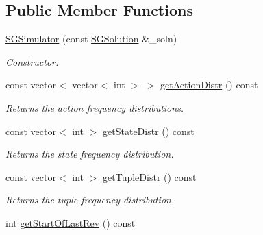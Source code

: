 \subsection*{Public Member Functions}
\begin{DoxyCompactItemize}
\item 
\mbox{\label{classSGSimulator_ad8e72623b6f2d9ecb46b5e5fe5f68d10}} 
\hyperlink{classSGSimulator_ad8e72623b6f2d9ecb46b5e5fe5f68d10}{S\+G\+Simulator} (const \hyperlink{classSGSolution}{S\+G\+Solution} \&\+\_\+soln)
\begin{DoxyCompactList}\small\item\em Constructor. \end{DoxyCompactList}\item 
\mbox{\label{classSGSimulator_acff36ca01d87aec1817cd8ceecfbb1d1}} 
const vector$<$ vector$<$ int $>$ $>$ \hyperlink{classSGSimulator_acff36ca01d87aec1817cd8ceecfbb1d1}{get\+Action\+Distr} () const
\begin{DoxyCompactList}\small\item\em Returns the action frequency distributions. \end{DoxyCompactList}\item 
\mbox{\label{classSGSimulator_a0c60d6e663f83fff6f3818cc90412356}} 
const vector$<$ int $>$ \hyperlink{classSGSimulator_a0c60d6e663f83fff6f3818cc90412356}{get\+State\+Distr} () const
\begin{DoxyCompactList}\small\item\em Returns the state frequency distribution. \end{DoxyCompactList}\item 
\mbox{\label{classSGSimulator_aeafea7815915ec935ebb5dce827a7c85}} 
const vector$<$ int $>$ \hyperlink{classSGSimulator_aeafea7815915ec935ebb5dce827a7c85}{get\+Tuple\+Distr} () const
\begin{DoxyCompactList}\small\item\em Returns the tuple frequency distribution. \end{DoxyCompactList}\item 
\mbox{\label{classSGSimulator_aea3e4db4cbf23c1ae0afdee9c4ea670f}} 
int \hyperlink{classSGSimulator_aea3e4db4cbf23c1ae0afdee9c4ea670f}{get\+Start\+Of\+Last\+Rev} () const

\end{DoxyCompactItemize}
